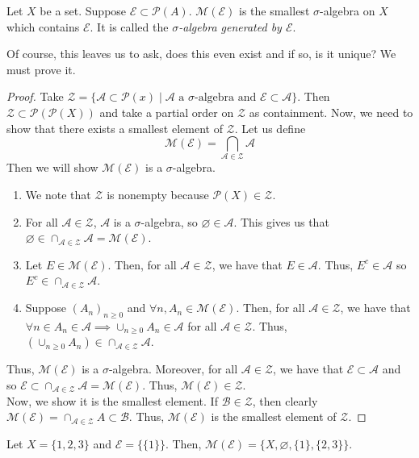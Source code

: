 \documentclass[11pt,leqno,oneside]{amsbook}
\numberwithin{thm}{section}
\renewcommand{\P}{\mathcal{P}}
\renewcommand{\A}{\mathcal{A}}
\newcommand{\M}{\mathcal{M}}
\newcommand{\Ep}{\mathcal{E}}
\begin{document}
\begin{defn}
  Let $X$ be a set. Suppose $\Ep \subset \P(A)$. $\M(\Ep)$ is the
  smallest $\sigma$-algebra on $X$ which contains $\Ep$.  It is called the
  \emph{$\sigma$-algebra generated by $\Ep$}.
\end{defn}
Of course, this leaves us to ask, does this even exist and if so, is
it unique? We must prove it.
\begin{proof}
  Take $\mathcal{Z} = \{\A \subset \P(x) \mid \A \text{ a }
  \sigma\text{-algebra and } \Ep \subset \A\}$. Then $\mathcal{Z}
  \subset \P(\P(X))$ and take a partial order on $\mathcal{Z}$ as
  containment. Now, we need to show that there exists a smallest
  element of $\mathcal{Z}$. Let us define \[
    \M(\Ep) = \bigcap_{\A \in \mathcal{Z}} \A
  \]
  Then we will show $\M(\Ep)$ is a $\sigma$-algebra.
  \begin{enumerate}
  \item We note that $\mathcal{Z}$ is nonempty because $\P(X) \in \mathcal{Z}$.
  \item For all $\A \in \mathcal{Z}$, $\A$ is a $\sigma$-algebra, so
    $\varnothing \in \A$. This gives us that $\varnothing \in \cap_{\A
      \in \mathcal{Z}} \A = \M(\Ep)$.
  \item Let $E \in \M(\Ep)$. Then, for all $\A \in \mathcal{Z}$, we have that
    $E \in \A$. Thus, $E^c \in \A$ so $E^c \in \cap_{\A \in \mathcal{Z}} \A$.
  \item Suppose $(A_n)_{n \geq 0}$ and $\forall n, A_n \in
    \M(\Ep)$. Then, for all $\A \in \mathcal{Z}$, we have that $\forall n \in
    A_n \in \A \implies \cup_{n \geq 0} A_n \in \A$ for all $\A
    \in \mathcal{Z}$. Thus, $(\cup_{n \geq 0} A_n) \in \cap_{\A \in \mathcal{Z}} \A$.
  \end{enumerate}
  Thus, $\M(\Ep)$ is a $\sigma$-algebra. Moreover, for all $\A \in
  \mathcal{Z}$, we have that $\Ep \subset \A$ and so $\Ep \subset \cap_{\A \in
    \mathcal{Z}} \A = \M(\Ep)$. Thus, $\M(\Ep) \in \mathcal{Z}$. \\

  Now, we show it is the smallest element. If $\mathscr{B} \in
  \mathcal{Z}$, then clearly $\M(\Ep) = \cap_{\A \in \mathcal{Z}} A
  \subset \mathscr{B}$. Thus, $\M(\Ep)$ is the smallest element of
  $\mathcal{Z}$.
\end{proof}
\begin{example}
  Let $X = \{1,2,3\}$ and $\Ep = \{\{1\}\}$. Then, $\M(\Ep) = \{X,
  \varnothing, \{1\},\{2,3\}\}$.
\end{example}
\end{document}
